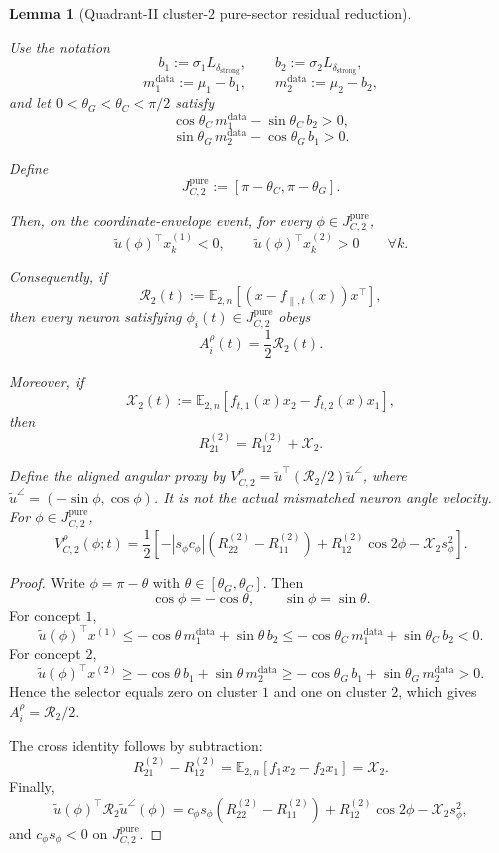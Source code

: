 \documentclass{article} %
\theoremstyle{plain}
\newtheorem{lemma}[theorem]{Lemma}
\theoremstyle{definition}
\theoremstyle{remark}
\begin{document}
\begin{lemma}[Quadrant-II cluster-$2$ pure-sector residual reduction]
\label{sbagg:lem:cluster2-pure-residual-reduction}

Use the notation
\[
b_1:=\sigma_1L_{\delta_{\mathrm{strong}}},
\qquad
b_2:=\sigma_2L_{\delta_{\mathrm{strong}}},
\]
\[
m_1^{\mathrm{data}}:=\mu_1-b_1,
\qquad
m_2^{\mathrm{data}}:=\mu_2-b_2,
\]
and let $0<\theta_G<\theta_C<\pi/2$ satisfy
\[
\cos\theta_C\,m_1^{\mathrm{data}}
-\sin\theta_C\,b_2>0,
\]
\[
\sin\theta_G\,m_2^{\mathrm{data}}
-\cos\theta_G\,b_1>0.
\]

Define
\[
\boxed{
J_{C,2}^{\mathrm{pure}}
:=
[\pi-\theta_C,\pi-\theta_G].
}
\]

Then, on the coordinate-envelope event, for every
$\phi\in J_{C,2}^{\mathrm{pure}}$,
\[
\boxed{
\widetilde u(\phi)^\top x_k^{(1)}<0,
\qquad
\widetilde u(\phi)^\top x_k^{(2)}>0
\qquad
\forall k.
}
\]

Consequently, if
\[
\mathcal R_2(t)
:=
\mathbb E_{2,n}
\left[
(x-f_{\parallel,t}(x))x^\top
\right],
\]
then every neuron satisfying
$\phi_i(t)\in J_{C,2}^{\mathrm{pure}}$ obeys
\[
\boxed{
A_i^\rho(t)=\frac12\mathcal R_2(t).
}
\]

Moreover, if
\[
\mathcal X_2(t)
:=
\mathbb E_{2,n}
[f_{t,1}(x)x_2-f_{t,2}(x)x_1],
\]
then
\[
\boxed{
R_{21}^{(2)}
=
R_{12}^{(2)}+\mathcal X_2.
}
\]

Define the aligned angular proxy by $V_{C,2}^\rho=\widetilde u^\top(\mathcal R_2/2)\widetilde u^\angle$, where $\widetilde u^\angle=(-\sin\phi,\cos\phi)$. It is not the actual mismatched neuron angle velocity. For $\phi\in J_{C,2}^{\mathrm{pure}}$,
\[
\boxed{
V_{C,2}^\rho(\phi;t)
=
\frac12
\left[
-|s_\phi c_\phi|
(R_{22}^{(2)}-R_{11}^{(2)})
+
R_{12}^{(2)}\cos2\phi
-
\mathcal X_2s_\phi^2
\right].
}
\]
\end{lemma}

\begin{proof}
Write $\phi=\pi-\theta$ with
$\theta\in[\theta_G,\theta_C]$.
Then
\[
\cos\phi=-\cos\theta,
\qquad
\sin\phi=\sin\theta.
\]
For concept $1$,
\[
\widetilde u(\phi)^\top x^{(1)}
\le
-\cos\theta\,m_1^{\mathrm{data}}
+\sin\theta\,b_2
\le
-\cos\theta_C\,m_1^{\mathrm{data}}
+\sin\theta_C\,b_2
<0.
\]
For concept $2$,
\[
\widetilde u(\phi)^\top x^{(2)}
\ge
-\cos\theta\,b_1
+\sin\theta\,m_2^{\mathrm{data}}
\ge
-\cos\theta_G\,b_1
+\sin\theta_G\,m_2^{\mathrm{data}}
>0.
\]
Hence the selector equals zero on cluster $1$ and one on cluster $2$,
which gives $A_i^\rho=\mathcal R_2/2$.

The cross identity follows by subtraction:
\[
R_{21}^{(2)}-R_{12}^{(2)}
=
\mathbb E_{2,n}[f_1x_2-f_2x_1]
=
\mathcal X_2.
\]
Finally,
\[
\widetilde u(\phi)^\top\mathcal R_2\widetilde u^\angle(\phi)
=
c_\phi s_\phi(R_{22}^{(2)}-R_{11}^{(2)})
+
R_{12}^{(2)}\cos2\phi
-
\mathcal X_2s_\phi^2,
\]
and $c_\phi s_\phi<0$ on $J_{C,2}^{\mathrm{pure}}$.
\end{proof}
\end{document}
